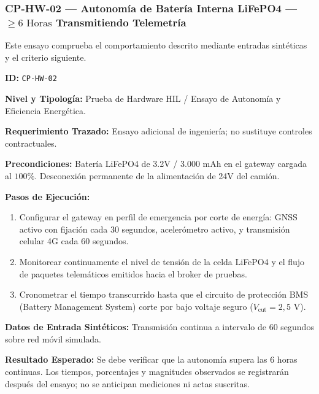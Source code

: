 \subsubsection*{CP-HW-02 — Autonomía de Batería Interna LiFePO4 — \(\ge 6\text{ Horas}\) Transmitiendo Telemetría}\label{sec:9-cp-hw-02}
Este ensayo comprueba el comportamiento descrito mediante entradas sintéticas y el criterio siguiente.

\par\noindent\textbf{ID:} \texttt{C\allowbreak{}P\allowbreak{}-\allowbreak{}H\allowbreak{}W\allowbreak{}-\allowbreak{}0\allowbreak{}2\allowbreak{}}\par
\par\noindent\textbf{Nivel y Tipología:} Prueba de Hardware HIL / Ensayo de Autonomía y Eficiencia Energética.\par
\par\noindent\textbf{Requerimiento Trazado:} Ensayo adicional de ingeniería; no sustituye controles contractuales.\par
\par\noindent\textbf{Precondiciones:} Batería LiFePO4 de 3.2V / 3.000 mAh en el gateway cargada al \(100\%\). Desconexión permanente de la alimentación de 24V del camión.\par
\par\noindent\textbf{Pasos de Ejecución:} \par
\begin{enumerate}
\item Configurar el gateway en perfil de emergencia por corte de energía: GNSS activo con fijación cada 30 segundos, acelerómetro activo, y transmisión celular 4G cada 60 segundos.
\item Monitorear continuamente el nivel de tensión de la celda LiFePO4 y el flujo de paquetes telemáticos emitidos hacia el broker de pruebas.
\item Cronometrar el tiempo transcurrido hasta que el circuito de protección BMS (Battery Management System) corte por bajo voltaje seguro (\(V_{\mbox{cut}} = 2{,}5\text{ V}\)).
\end{enumerate}
\par\noindent\textbf{Datos de Entrada Sintéticos:} Transmisión continua a intervalo de 60 segundos sobre red móvil simulada.\par
\par\noindent\textbf{Resultado Esperado:} Se debe verificar que la autonomía supera las 6 horas continuas. Los tiempos, porcentajes y magnitudes observados se registrarán después del ensayo; no se anticipan mediciones ni actas suscritas.\par
